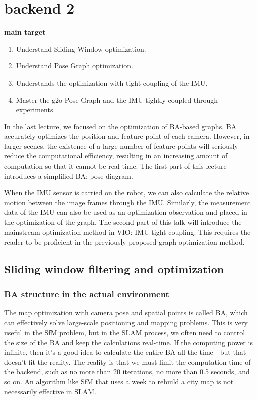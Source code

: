 \chapter{backend 2}
\begin{mdframed}
\textbf{main target}
\begin{enumerate}[labelindent=0em,leftmargin=1.5em]
\item Understand Sliding Window optimization.
\item Understand Pose Graph optimization.
\item Understands the optimization with tight coupling of the IMU.
\item Master the g2o Pose Graph and the IMU tightly coupled through experiments.
\end{enumerate}
\end{mdframed}

In the last lecture, we focused on the optimization of BA-based graphs. BA accurately optimizes the position and feature point of each camera. However, in larger scenes, the existence of a large number of feature points will seriously reduce the computational efficiency, resulting in an increasing amount of computation so that it cannot be real-time. The first part of this lecture introduces a simplified BA: pose diagram.

When the IMU sensor is carried on the robot, we can also calculate the relative motion between the image frames through the IMU. Similarly, the measurement data of the IMU can also be used as an optimization observation and placed in the optimization of the graph. The second part of this talk will introduce the mainstream optimization method in VIO: IMU tight coupling. This requires the reader to be proficient in the previously proposed graph optimization method.

\newpage
\section{Sliding window filtering and optimization}
\subsection{BA structure in the actual environment}
The map optimization with camera pose and spatial points is called BA, which can effectively solve large-scale positioning and mapping problems. This is very useful in the SfM problem, but in the SLAM process, we often need to control the size of the BA and keep the calculations real-time. If the computing power is infinite, then it's a good idea to calculate the entire BA all the time - but that doesn't fit the reality. The reality is that we must limit the computation time of the backend, such as no more than 20 iterations, no more than 0.5 seconds, and so on. An algorithm like SfM that uses a week to rebuild a city map is not necessarily effective in SLAM.

